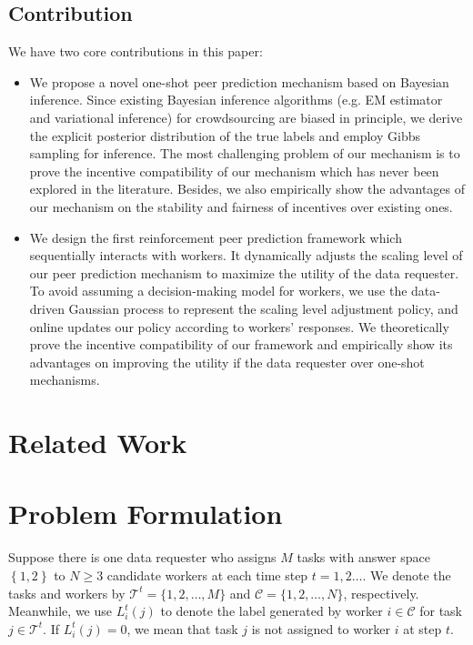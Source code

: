 \documentclass{article}
\begin{document}
\subsection{Contribution}
We have two core contributions in this paper:
\begin{itemize}
\item We propose a novel one-shot peer prediction mechanism based on Bayesian inference. Since existing Bayesian inference algorithms (e.g. EM estimator and variational inference) for crowdsourcing are biased in principle, we derive the explicit posterior distribution of the true labels and employ Gibbs sampling for inference. The most challenging problem of our mechanism is to prove the incentive compatibility of our mechanism which has never been explored in the literature. Besides, we also empirically show the advantages of our mechanism on the stability and fairness of incentives over existing ones.
\item We design the first reinforcement peer prediction framework which sequentially interacts with workers. It dynamically adjusts the scaling level of our peer prediction mechanism to maximize the utility of the data requester. To avoid assuming a decision-making model for workers, we use the data-driven Gaussian process to represent the scaling level adjustment policy, and online updates our policy according to workers' responses. We theoretically prove the incentive compatibility of our framework and empirically show its advantages on improving the utility if the data requester over one-shot mechanisms.
\end{itemize}

\section{Related Work}

\newpage
\section{Problem Formulation}
\label{PF}
Suppose there is one data requester who assigns $M$ tasks with answer space $\left\{1,2\right\}$ to $N \geq 3$ candidate workers at each time step $t=1,2\ldots$.
We denote the tasks and workers by $\mathcal{T}^{t}=\{1,2,\ldots,M\}$ and $\mathcal{C}=\{1,2,\ldots,N\}$, respectively.
Meanwhile, we use $L^{t}_{i}(j)$ to denote the label generated by worker $i\in \mathcal{C}$ for task $j\in\mathcal{T}^{t}$.
If $L^{t}_{i}(j)=0$, we mean that task $j$ is not assigned to worker $i$ at step $t$.
\end{document}
